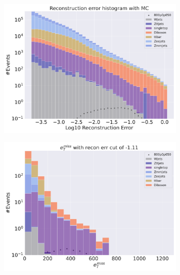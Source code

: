 \begin{figure}[H]
    \centering
    \begin{subfigure}{.40\textwidth}
        \includegraphics[width=\textwidth]{Figures/AE_testing/big/2lep/b_data_recon_big_rm3_feats_sig_800p0p050_.pdf}
        \caption{ }
        \label{fig:AE_2lep_big_800_2}
    \end{subfigure}
    \hfill
    \begin{subfigure}{.40\textwidth}
        \includegraphics[width=\textwidth]{Figures/AE_testing/big/2lep/b_data_recon_big_rm3_feats_sig_800p0p050_recon_errcut_-1.11.pdf}
        \caption{}
        \label{fig:AE_2lep_big_etmiss_800_2}
    \end{subfigure}
    \hfill
      

\end{figure}
